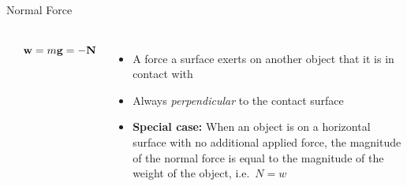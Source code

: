 \documentclass[12pt,compress,aspectratio=169]{beamer}
\newcommand{\mb}[1]{\ensuremath\mathbf{#1}}
\begin{document}
\begin{frame}{Normal Force}
  \begin{columns}
    \begin{center}
    \end{center}
    \begin{displaymath}
      \mb{w}=m\mb{g}=-\mb{N}
    \end{displaymath}
    
    \begin{itemize}
    \item A force a surface exerts on another object that it is in contact with
    \item Always \emph{perpendicular} to the contact surface
    \item\textbf{Special case:} When an object is on a horizontal surface
      with no additional applied force, the magnitude of the normal force is
      equal to the magnitude of the weight of the object, i.e.\ $N=w$
    \end{itemize}
  \end{columns}
\end{frame}
\end{document}
